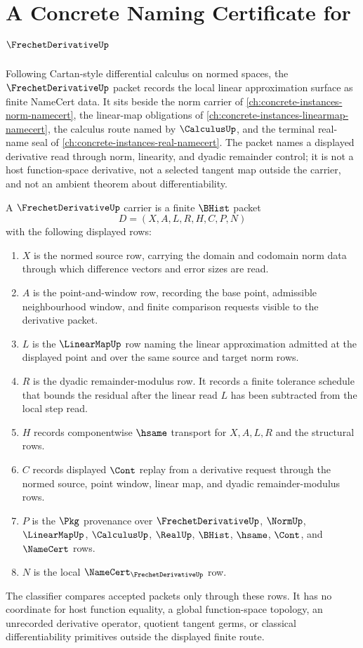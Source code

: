 \chapter{A Concrete Naming Certificate for $\FrechetDerivativeUp$}
\label{ch:concrete-instances-frechet-derivative-namecert}

Following Cartan-style differential calculus on normed spaces, the $\FrechetDerivativeUp$ packet records the local linear approximation surface as finite NameCert data. It sits beside the norm carrier of \autoref{ch:concrete-instances-norm-namecert}, the linear-map obligations of \autoref{ch:concrete-instances-linearmap-namecert}, the calculus route named by $\CalculusUp$, and the terminal real-name seal of \autoref{ch:concrete-instances-real-namecert}. The packet names a displayed derivative read through norm, linearity, and dyadic remainder control; it is not a host function-space derivative, not a selected tangent map outside the carrier, and not an ambient theorem about differentiability.

\begin{definition}
\label{def:frechet-derivative-carrier}
A $\FrechetDerivativeUp$ carrier is a finite $\BHist$ packet
$$
D=(X,A,L,R,H,C,P,N)
$$
with the following displayed rows:
\begin{enumerate}
\item $X$ is the normed source row, carrying the domain and codomain norm data through which difference vectors and error sizes are read.
\item $A$ is the point-and-window row, recording the base point, admissible neighbourhood window, and finite comparison requests visible to the derivative packet.
\item $L$ is the $\LinearMapUp$ row naming the linear approximation admitted at the displayed point and over the same source and target norm rows.
\item $R$ is the dyadic remainder-modulus row. It records a finite tolerance schedule that bounds the residual after the linear read $L$ has been subtracted from the local step read.
\item $H$ records componentwise $\hsame$ transport for $X,A,L,R$ and the structural rows.
\item $C$ records displayed $\Cont$ replay from a derivative request through the normed source, point window, linear map, and dyadic remainder-modulus rows.
\item $P$ is the $\Pkg$ provenance over $\FrechetDerivativeUp$, $\NormUp$, $\LinearMapUp$, $\CalculusUp$, $\RealUp$, $\BHist$, $\hsame$, $\Cont$, and $\NameCert$ rows.
\item $N$ is the local $\NameCert_{\FrechetDerivativeUp}$ row.
\end{enumerate}
The classifier compares accepted packets only through these rows. It has no coordinate for host function equality, a global function-space topology, an unrecorded derivative operator, quotient tangent germs, or classical differentiability primitives outside the displayed finite route.
\end{definition}

